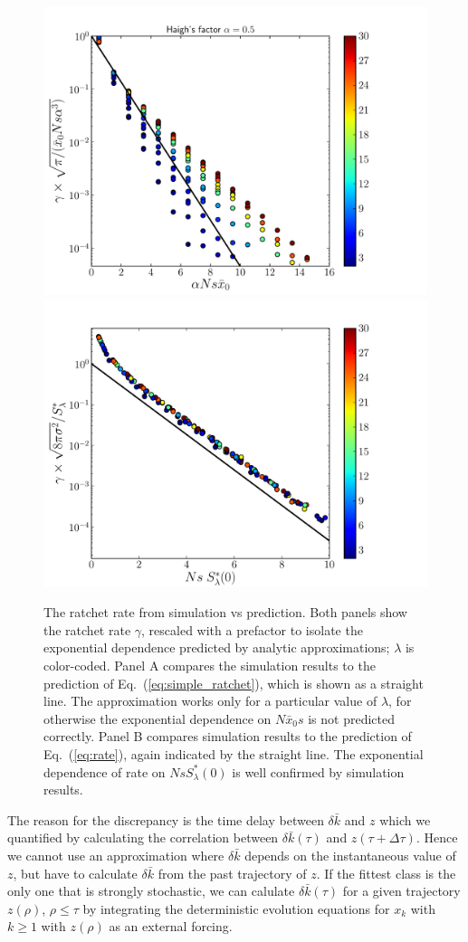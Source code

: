 \documentclass[rmp,preprint]{revtex4}
\newcommand{\EQ}[1]{Eq.~(\ref{eq:#1})}
\newcommand{\x}{x}
\newcommand{\xs}{\bar{\x}}
\newcommand{\xz}{z}
\newcommand{\rate}{\gamma}
\newcommand{\dk}{\delta \bar{k}}
\newcommand{\Smin}{S^*}
\begin{document}
\begin{figure}[tb]
\begin{center}
  \includegraphics[width=0.48\columnwidth]{Figures/rates_GC}
  \includegraphics[width=0.48\columnwidth]{Figures/rates_Smin}
  \caption[labelInTOC]{The ratchet rate from simulation vs prediction. Both panels show the ratchet rate $\rate$, rescaled with a prefactor to isolate the exponential dependence predicted by analytic approximations; $\lambda$ is color-coded. Panel A compares the simulation results to the prediction of \EQ{simple_ratchet}, which is shown as a straight line. The approximation works only for a particular value of $\lambda$, for otherwise the exponential dependence on $N\xs_0 s$ is not predicted correctly. Panel B compares simulation results to the prediction of \EQ{rate}, again indicated by the straight line. The exponential dependence of rate on $Ns\Smin_{\lambda}(0)$ is well confirmed by simulation results.}
  \label{fig:action}
\end{center}
\end{figure}

The reason for the discrepancy is the time delay between $\dk$ and $\xz$ which we quantified by calculating the correlation between $\dk(\tau)$ and $\xz(\tau+\Delta \tau)$. Hence we cannot use an approximation where $\dk$ depends on the instantaneous value of $\xz$, but have to calculate $\dk$ from the past trajectory of $\xz$. If the fittest class is the only one that is strongly stochastic, we can calulate $\dk(\tau)$ for a given trajectory $\xz(\rho)$, $\rho\leq \tau$ by integrating the deterministic evolution equations for $\x_k$ with $k\geq 1$ with $\xz(\rho)$ as an external forcing. 
\end{document}
